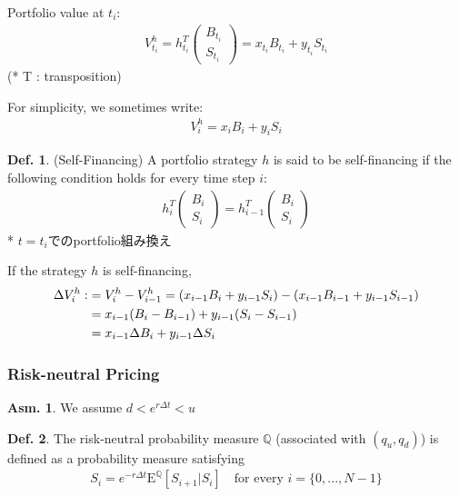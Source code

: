 \documentclass[a4paper,11pt]{jsarticle}
\theoremstyle{definition}
\newtheorem{definition}{Def.}[subsection]
\newtheorem{asm}{Asm.}[subsection]
\begin{document}
Portfolio value at $t_i$:
\begin{align}
  V_{t_i}^h=h_{t_i}^T \left(
    \begin{array}{c}
      B_{t_i} \\
      S_{t_i}
    \end{array}
  \right)
  =x_{t_i}B_{t_i} + y_{t_i}S_{t_i}
\end{align}
(* T : transposition)

For simplicity, we sometimes write:
\begin{align}
  V_i^h=x_i B_i + y_i S_i
\end{align}

\begin{definition}{(Self-Financing)}
  A portfolio strategy $h$ is said to be self-financing
  if the following condition holds for every time step $i$:
  \begin{align}
    h_i^T \left(
    \begin{array}{c}
      B_i \\ S_i
    \end{array}
    \right)
    = h_{i-1}^T \left(
    \begin{array}{c}
      B_i \\ S_i
    \end{array}
    \right)
  \end{align}
  * $t=t_i$でのportfolio組み換え
\end{definition}

If the strategy $h$ is self-financing,
\begin{align}
  \Delta V_i^h:&=V_i^h-V_{i-1}^h
  =(x_{i-1}B_i + y_{i-1}S_i)-(x_{i-1}B_{i-1} + y_{i-1}S_{i-1})\notag\\
  &=x_{i-1}(B_i-B_{i-1})+y_{i-1}(S_i-S_{i-1}) \notag\\
  &=x_{i-1}\Delta B_i + y_{i-1}\Delta S_i
\end{align}

\subsubsection{Risk-neutral Pricing}
\begin{asm}\label{asm_noarb}
  We assume $d<e^{r\Delta t}<u$
\end{asm}
\begin{definition}
  The risk-neutral probability measure $\mathbb{Q}$
  (associated with $(q_u,q_d)$) is defined as a probability
  measure satisfying
  \begin{align}
    S_i=e^{-r\Delta t}\mathrm{E}^{\mathbb{Q}}
    [S_{i+1}|S_i] \quad \mbox{for every } i=\{0,...,N-1\}
  \end{align}
\end{definition}
\end{document}
